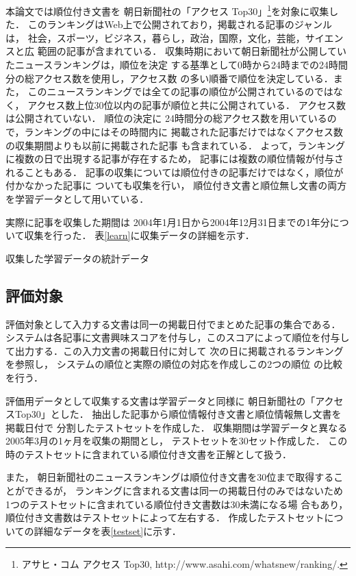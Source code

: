 \documentclass[japanese]{jnlp_1.4}
\begin{document}
本論文では順位付き文書を
朝日新聞社の「アクセス Top30」\footnote{
アサヒ・コム アクセス Top30, http://www.asahi.com/whatsnew/ranking/.
}を対象に収集した．
このランキングはWeb上で公開されており，掲載される記事のジャンルは，
社会，スポーツ，ビジネス，暮らし，政治，国際，文化，芸能，サイエンスと広
範囲の記事が含まれている．
収集時期において朝日新聞社が公開していたニュースランキングは，順位を決定
する基準として0時から24時までの24時間分の総アクセス数を使用し，アクセス数
の多い順番で順位を決定している．また，
このニュースランキングでは全ての記事の順位が公開されているのではなく，
アクセス数上位30位以内の記事が順位と共に公開されている．
アクセス数は公開されていない．
順位の決定に
24時間分の総アクセス数を用いているので，ランキングの中にはその時間内に
掲載された記事だけではなくアクセス数の収集期間よりも以前に掲載された記事
も含まれている．
よって，ランキングに複数の日で出現する記事が存在するため，
記事には複数の順位情報が付与されることもある．
記事の収集については順位付きの記事だけではなく，順位が付かなかった記事に
ついても収集を行い，
順位付き文書と順位無し文書の両方を学習データとして用いている．

実際に記事を収集した期間は
2004年1月1日から2004年12月31日までの1年分について収集を行った．
表\ref{learn}に収集データの詳細を示す．

\begin{table}[b]
\caption{収集した学習データの統計データ}
\label{learn}

\end{table}


\subsection{評価対象}\label{sec_collect_eval}

評価対象として入力する文書は同一の掲載日付でまとめた記事の集合である．
システムは各記事に文書興味スコアを付与し，このスコアによって順位を付与し
て出力する．この入力文書の掲載日付に対して
次の日に掲載されるランキングを参照し，
システムの順位と実際の順位の対応を作成しこの2つの順位
の比較を行う．

評価用データとして収集する文書は学習データと同様に
朝日新聞社の「アクセスTop30」とした．
抽出した記事から順位情報付き文書と順位情報無し文書を掲載日付で
分割したテストセットを作成した．
収集期間は学習データと異なる2005年3月の1ヶ月を収集の期間とし，
テストセットを30セット作成した．
この時のテストセットに含まれている順位付き文書を正解として扱う．

また，
朝日新聞社のニュースランキングは順位付き文書を30位まで取得することができるが，
ランキングに含まれる文書は同一の掲載日付のみではないため
1つのテストセットに含まれている順位付き文書数は30未満になる場
合もあり，順位付き文書数はテストセットによって左右する．
作成したテストセットについての詳細なデータを表\ref{testset}に示す．
\end{document}

